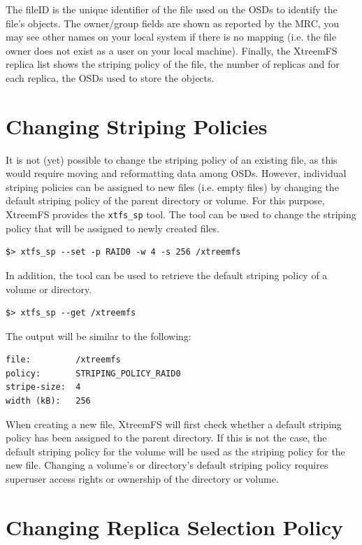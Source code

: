 \documentclass[a4paper,10pt]{book}
\begin{document}
The fileID  is the unique identifier of the file used on the OSDs to identify the file's objects. The owner/group fields are shown as reported by the MRC, you may see other names on your local system if there is no mapping (i.e. the file owner does not exist as a user on your local machine).
Finally, the XtreemFS replica list shows the striping policy of the file, the number of replicas and for each replica, the OSDs used to store the objects.


\section{Changing Striping Policies}

It is not (yet) possible to change the striping policy of an existing file, as this would require moving and reformatting data among OSDs. However, individual striping policies can be assigned to new files (i.e. empty files) by changing the default striping policy of the parent directory or volume. For this purpose, XtreemFS provides the \texttt{xtfs\_sp} tool. The tool can be used to change the striping policy that will be assigned to newly created files.

\begin{verbatim}
$> xtfs_sp --set -p RAID0 -w 4 -s 256 /xtreemfs
\end{verbatim}

In addition, the tool can be used to retrieve the default striping policy of a volume or directory.

\begin{verbatim}
$> xtfs_sp --get /xtreemfs
\end{verbatim}

The output will be similar to the following:

\begin{verbatim}
file:         /xtreemfs
policy:       STRIPING_POLICY_RAID0
stripe-size:  4
width (kB):   256
\end{verbatim}

When creating a new file, XtreemFS will first check whether a default striping policy has been assigned to the parent directory. If this is not the case, the default striping policy for the volume will be used as the striping policy for the new file. Changing a volume's or directory's default striping policy requires superuser access rights or ownership of the directory or volume.

\section{Changing Replica Selection Policy}\label{sec:repl_select_policy}
\end{document}
